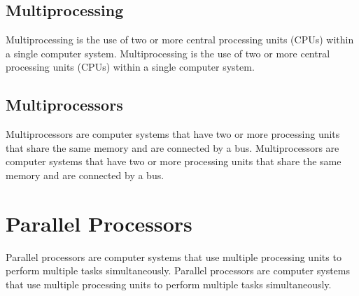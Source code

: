 \documentclass{article}
\begin{document}
\subsection*{Multiprocessing}
Multiprocessing is the use of two or more central processing units (CPUs) within a single computer system. Multiprocessing is the use of two or more central processing units (CPUs) within a single computer system.
\subsection*{Multiprocessors}
Multiprocessors are computer systems that have two or more processing units that share the same memory and are connected by a bus. Multiprocessors are computer systems that have two or more processing units that share the same memory and are connected by a bus.
\section*{Parallel Processors}
Parallel processors are computer systems that use multiple processing units to perform multiple tasks simultaneously. Parallel processors are computer systems that use multiple processing units to perform multiple tasks simultaneously.
\end{document}
